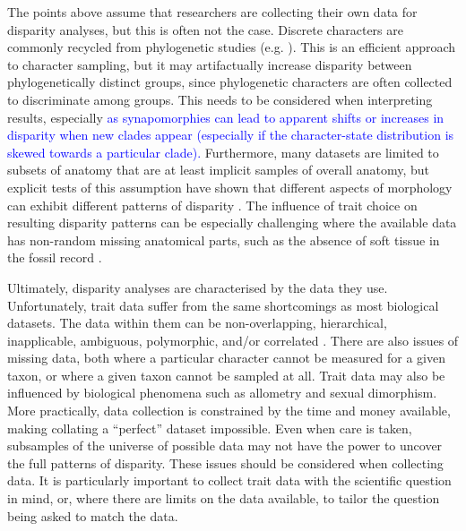 \documentclass[12pt,letterpaper]{article}
\begin{document}
The points above assume that researchers are collecting their own data for disparity analyses, but this is often not the case.
Discrete characters are commonly recycled from phylogenetic studies (e.g. \citealt{Brusatte2008,Close2015}).
This is an efficient approach to character sampling, but it may artifactually increase disparity between phylogenetically distinct groups, since phylogenetic characters are often collected to discriminate among groups.
This needs to be considered when interpreting results, especially \textcolor{blue}{as synapomorphies can lead to apparent shifts or increases in disparity when new clades appear (especially if the character-state distribution is skewed towards a particular clade).}
Furthermore, many datasets are limited to subsets of anatomy that are at least implicit samples of overall anatomy, but explicit tests of this assumption have shown that different aspects of morphology can exhibit different patterns of disparity \citep{Hopkins2017}.
The influence of trait choice on resulting disparity patterns can be especially challenging where the available data has non-random missing anatomical parts, such as the absence of soft tissue in the fossil record \citep{Deline2018}.

Ultimately, disparity analyses are characterised by the data they use. Unfortunately, trait data suffer from the same shortcomings as most biological datasets. The data within them can be non-overlapping, hierarchical, inapplicable, ambiguous, polymorphic, and/or correlated \citep{Palci2018}. There are also issues of missing data, both where a particular character cannot be measured for a given taxon, or where a given taxon cannot be sampled at all. Trait data may also be influenced by biological phenomena such as allometry and sexual dimorphism. More practically, data collection is constrained by the time and money available, making collating a ``perfect'' dataset impossible. Even when care is taken, subsamples of the universe of possible data may not have the power to uncover the full patterns of disparity. These issues should be considered when collecting data. It is particularly important to collect trait data with the scientific question in mind, or, where there are limits on the data available, to tailor the question being asked to match the data. 
\end{document}
